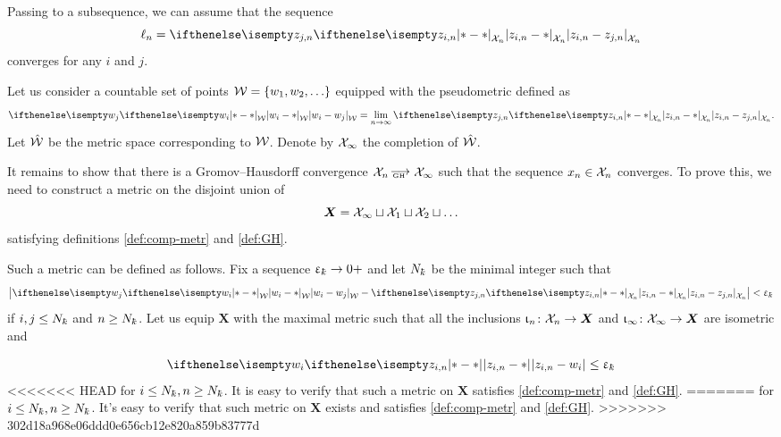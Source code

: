 Passing to a subsequence, we can assume that the sequence \[\ell_n=\dist{z_{i,n}}{z_{j,n}}{\spc{X}_n}\] 
converges for any $i$ and $j$.

Let us consider a countable set of points $\spc{W}=\{w_1,w_2,\dots\}$
equipped with the pseudometric defined as 
\[\dist{w_i}{w_j}{\spc{W}}
=
\lim_{n\to\infty}\dist{z_{i,n}}{z_{j,n}}{\spc{X}_n}.\]
Let $\hat{\mathcal{W}}$ be the metric space corresponding to $\mathcal{W}$.
Denote by
$\mathcal{X}_\infty$ the completion of $\hat{\mathcal{W}}$.

It remains to show that there is a Gromov--Hausdorff convergence 
$\spc{X}_n\GHto\spc{X}_\infty$ such that the sequence $x_n\in\spc{X}_n$ converges.
To prove this, we need to construct a metric on the disjoint union of \[\bm{X}=\spc{X}_\infty\sqcup\spc{X}_1\sqcup\spc{X}_2\sqcup\dots\] 
satisfying definitions \ref{def:comp-metr} and \ref{def:GH}.

Such a  metric can be defined as follows.
Fix a sequence $\eps_\kay\to0+$
and let $N_\kay$ be the minimal integer such that
\[\left|\dist{w_i}{w_j}{\spc{W}}
-
\dist{z_{i,n}}{z_{j,n}}{\spc{X}_n}\right|<\eps_\kay
\]
if $i,j\le N_\kay$ and $n\ge N_\kay$. 
Let us equip $\bm{X}$ with the maximal metric such that all the inclusions $\iota_n\:\spc{X}_n\to\bm X$  and $\iota_\infty\:\spc{X}_\infty\to\bm X$ are isometric and 

\[
\dist{z_{i,n}}{w_i}{}\le \eps_\kay
\]
<<<<<<< HEAD
for $i\le N_\kay, n\ge N_\kay$. It is easy to verify  that such a metric on $\bm X$ satisfies  \ref{def:comp-metr} and \ref{def:GH}.
=======
for $i\le N_\kay, n\ge N_\kay$. It's easy to verify  that such metric on $\bm X$ exists and  satisfies  \ref{def:comp-metr} and \ref{def:GH}.
>>>>>>> 302d18a968e06ddd0e656cb12e820a859b83777d


\qeds

